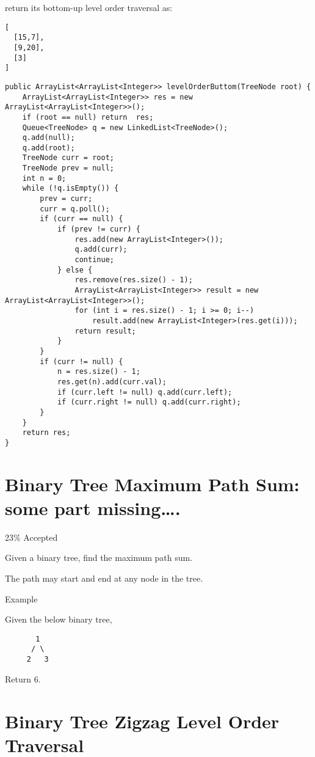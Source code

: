 \documentclass[12pt]{book}
\begin{document}
return its bottom-up level order traversal as:
\lstset{language=java,label= ,caption= ,numbers=none}
\begin{lstlisting}
[
  [15,7],
  [9,20],
  [3]
]
\end{lstlisting}
\lstset{language=java,label= ,caption= ,numbers=none}
\begin{lstlisting}
public ArrayList<ArrayList<Integer>> levelOrderButtom(TreeNode root) {
    ArrayList<ArrayList<Integer>> res = new ArrayList<ArrayList<Integer>>();
    if (root == null) return  res;
    Queue<TreeNode> q = new LinkedList<TreeNode>();
    q.add(null);
    q.add(root);
    TreeNode curr = root;
    TreeNode prev = null;
    int n = 0;
    while (!q.isEmpty()) {
        prev = curr;
        curr = q.poll();
        if (curr == null) {
            if (prev != curr) {
                res.add(new ArrayList<Integer>());
                q.add(curr);
                continue;
            } else {
                res.remove(res.size() - 1);
                ArrayList<ArrayList<Integer>> result = new ArrayList<ArrayList<Integer>>();
                for (int i = res.size() - 1; i >= 0; i--) 
                    result.add(new ArrayList<Integer>(res.get(i)));
                return result;   
            }
        }
        if (curr != null) {
            n = res.size() - 1;
            res.get(n).add(curr.val);
            if (curr.left != null) q.add(curr.left);
            if (curr.right != null) q.add(curr.right);
        }
    }
    return res;
}
\end{lstlisting}
\chapter{Binary Tree Maximum Path Sum: some part missing\ldots{}.}
\label{sec-17}

23\% Accepted

Given a binary tree, find the maximum path sum.

The path may start and end at any node in the tree.

Example

Given the below binary tree,
\lstset{language=java,label= ,caption= ,numbers=none}
\begin{lstlisting}
       1
      / \
     2   3
\end{lstlisting}

Return 6.
\chapter{Binary Tree Zigzag Level Order Traversal}
\label{sec-18}
\end{document}
